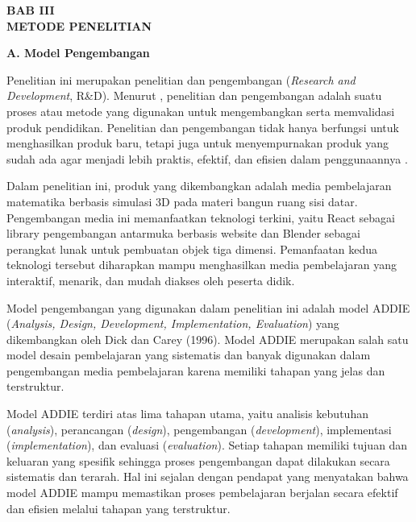 \newpage
\begin{center}
    \textbf{BAB III}\\
    \textbf{METODE PENELITIAN}
\end{center}

\textbf{A. Model Pengembangan}


\hspace*{1cm}Penelitian ini merupakan penelitian dan pengembangan (\textit{Research and Development}, R\&D). Menurut \cite{borg1989}, penelitian dan pengembangan adalah suatu proses atau metode yang digunakan untuk mengembangkan serta memvalidasi produk pendidikan. Penelitian dan pengembangan tidak hanya berfungsi untuk menghasilkan produk baru, tetapi juga untuk menyempurnakan produk yang sudah ada agar menjadi lebih praktis, efektif, dan efisien dalam penggunaannya \citep{sugiyono2018}.

\hspace*{1cm}Dalam penelitian ini, produk yang dikembangkan adalah media pembelajaran matematika berbasis simulasi 3D pada materi bangun ruang sisi datar. Pengembangan media ini memanfaatkan teknologi terkini, yaitu React sebagai library pengembangan antarmuka berbasis website dan Blender sebagai perangkat lunak untuk pembuatan objek tiga dimensi. Pemanfaatan kedua teknologi tersebut diharapkan mampu menghasilkan media pembelajaran yang interaktif, menarik, dan mudah diakses oleh peserta didik.

\hspace*{1cm}Model pengembangan yang digunakan dalam penelitian ini adalah model ADDIE (\textit{Analysis, Design, Development, Implementation, Evaluation}) yang dikembangkan oleh Dick dan Carey (1996). Model ADDIE merupakan salah satu model desain pembelajaran yang sistematis dan banyak digunakan dalam pengembangan media pembelajaran karena memiliki tahapan yang jelas dan terstruktur.

\hspace*{1cm}Model ADDIE terdiri atas lima tahapan utama, yaitu analisis kebutuhan (\textit{analysis}), perancangan (\textit{design}), pengembangan (\textit{development}), implementasi (\textit{implementation}), dan evaluasi (\textit{evaluation}). Setiap tahapan memiliki tujuan dan keluaran yang spesifik sehingga proses pengembangan dapat dilakukan secara sistematis dan terarah. Hal ini sejalan dengan pendapat \cite{gustiani2019} yang menyatakan bahwa model ADDIE mampu memastikan proses pembelajaran berjalan secara efektif dan efisien melalui tahapan yang terstruktur.

